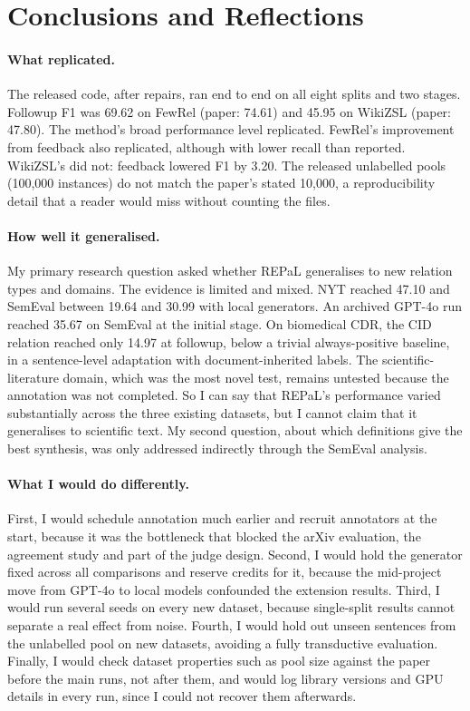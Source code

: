 \section{Conclusions and Reflections}
\label{sec:conclusions}

\paragraph{What replicated.} The released code, after repairs, ran end to end on all eight splits and two stages. Followup F1 was 69.62 on FewRel (paper: 74.61) and 45.95 on WikiZSL (paper: 47.80). The method's broad performance level replicated. FewRel's improvement from feedback also replicated, although with lower recall than reported. WikiZSL's did not: feedback lowered F1 by 3.20. The released unlabelled pools (100,000 instances) do not match the paper's stated 10,000, a reproducibility detail that a reader would miss without counting the files.

\paragraph{How well it generalised.} My primary research question asked whether REPaL generalises to new relation types and domains. The evidence is limited and mixed. NYT reached 47.10 and SemEval between 19.64 and 30.99 with local generators. An archived GPT-4o run reached 35.67 on SemEval at the initial stage. On biomedical CDR, the CID relation reached only 14.97 at followup, below a trivial always-positive baseline, in a sentence-level adaptation with document-inherited labels. The scientific-literature domain, which was the most novel test, remains untested because the annotation was not completed. So I can say that REPaL's performance varied substantially across the three existing datasets, but I cannot claim that it generalises to scientific text. My second question, about which definitions give the best synthesis, was only addressed indirectly through the SemEval analysis.

\paragraph{What I would do differently.} First, I would schedule annotation much earlier and recruit annotators at the start, because it was the bottleneck that blocked the arXiv evaluation, the agreement study and part of the judge design. Second, I would hold the generator fixed across all comparisons and reserve credits for it, because the mid-project move from GPT-4o to local models confounded the extension results. Third, I would run several seeds on every new dataset, because single-split results cannot separate a real effect from noise. Fourth, I would hold out unseen sentences from the unlabelled pool on new datasets, avoiding a fully transductive evaluation. Finally, I would check dataset properties such as pool size against the paper before the main runs, not after them, and would log library versions and GPU details in every run, since I could not recover them afterwards.
